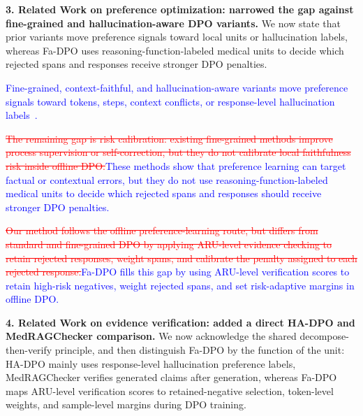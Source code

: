 \documentclass[12pt]{article}
\newcommand{\deleted}[1]{\textcolor{red}{\sout{#1}}}
\newcommand{\added}[1]{\textcolor{blue}{#1}}
\begin{document}
\textbf{3. Related Work on preference optimization: narrowed the gap against fine-grained and hallucination-aware DPO variants.}
We now state that prior variants move preference signals toward local units or
hallucination labels, whereas Fa-DPO uses reasoning-function-labeled medical units to
decide which rejected spans and responses receive stronger DPO penalties.

\begin{displayquote}
\added{Fine-grained, context-faithful, and hallucination-aware variants move preference signals toward tokens, steps, context conflicts, or response-level hallucination labels~\cite{gu2025maskdpo, zhou2025treg, yang2025sepo, xu2025fullstepdpo, bi2025contextdpo, zhao2024hadpo}.}

\deleted{The remaining gap is risk calibration: existing fine-grained methods improve process supervision or self-correction, but they do not calibrate local faithfulness risk inside offline DPO.}\added{These methods show that preference learning can target factual or contextual errors, but they do not use reasoning-function-labeled medical units to decide which rejected spans and responses should receive stronger DPO penalties.}

\deleted{Our method follows the offline preference-learning route, but differs from standard and fine-grained DPO by applying ARU-level evidence checking to retain rejected responses, weight spans, and calibrate the penalty assigned to each rejected response.}\added{Fa-DPO fills this gap by using ARU-level verification scores to retain high-risk negatives, weight rejected spans, and set risk-adaptive margins in offline DPO.}
\end{displayquote}

\textbf{4. Related Work on evidence verification: added a direct HA-DPO and MedRAGChecker comparison.}
We now acknowledge the shared decompose-then-verify principle, and then distinguish
Fa-DPO by the function of the unit: HA-DPO mainly uses response-level hallucination
preference labels, MedRAGChecker verifies generated claims after generation, whereas
Fa-DPO maps ARU-level verification scores to retained-negative selection, token-level
weights, and sample-level margins during DPO training.
\end{document}

